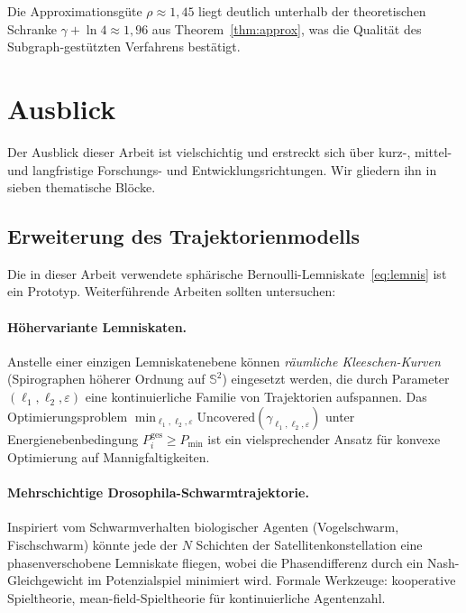 ﻿\documentclass[a4paper,12pt]{article}
\theoremstyle{definition}
\begin{document}
Die Approximationsg\"ute $\rho \approx 1{,}45$ liegt deutlich unterhalb der
theoretischen Schranke $\gamma + \ln 4 \approx 1{,}96$ aus Theorem~\ref{thm:approx},
was die Qualit\"at des Subgraph-gest\"utzten Verfahrens best\"atigt.

\section{Ausblick}
\label{sec:outlook}

Der Ausblick dieser Arbeit ist vielschichtig und erstreckt sich \"uber
kurz-, mittel- und langfristige Forschungs- und Entwicklungsrichtungen.
Wir gliedern ihn in sieben thematische Bl\"ocke.

\subsection{Erweiterung des Trajektorienmodells}

Die in dieser Arbeit verwendete sph\"arische Bernoulli-Lemniskate~\eqref{eq:lemnis}
ist ein Prototyp. Weiterf\"uhrende Arbeiten sollten untersuchen:

\paragraph{H\"ohervariante Lemniskaten.}
Anstelle einer einzigen Lemniskatenebene k\"onnen \emph{r\"aumliche
Kleeschen-Kurven} (Spirographen h\"oherer Ordnung auf $\mathbb{S}^2$)
eingesetzt werden, die durch Parameter $(\ell_1, \ell_2, \varepsilon)$
eine kontinuierliche Familie von Trajektorien aufspannen.
Das Optimierungsproblem
$\min_{\ell_1,\ell_2,\varepsilon} \mathrm{Uncovered}(\gamma_{\ell_1,\ell_2,\varepsilon})$
unter Energienebenbedingung $P_i^{\mathrm{ges}} \geq P_{\min}$
ist ein vielsprechender Ansatz f\"ur konvexe Optimierung auf Mannigfaltigkeiten.

\paragraph{Mehrschichtige Drosophila-Schwarmtrajektorie.}
Inspiriert vom Schwarmverhalten biologischer Agenten (Vogelschwarm, Fischschwarm)
k\"onnte jede der $N$ Schichten der Satellitenkonstellation eine phasenverschobene
Lemniskate fliegen, wobei die Phasendifferenz durch ein Nash-Gleichgewicht im
Potenzialspiel minimiert wird. Formale Werkzeuge: kooperative Spieltheorie,
mean-field-Spieltheorie f\"ur kontinuierliche Agentenzahl.
\end{document}
